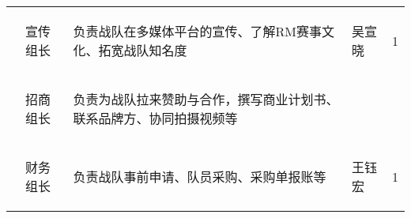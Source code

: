 \begin{longtable}{X | X | X | X | X}
    \cline{2-5}

        &
        \begin{center}
            宣传组长
        \end{center} &
        负责战队在多媒体平台的宣传、了解RM赛事文化、拓宽战队知名度 &
    \begin{center}
        吴宣晓
    \end{center}&
        \begin{center}
            1
        \end{center}\\

    \cline{2-5}

        &
        \begin{center}
            招商组长
        \end{center} &
        负责为战队拉来赞助与合作，撰写商业计划书、联系品牌方、协同拍摄视频等 &
        \begin{center}
            
        \end{center}&
        \begin{center}
            
        \end{center}\\

    \cline{2-5}

        &
        \begin{center}
            财务组长
        \end{center} &
        负责战队事前申请、队员采购、采购单报账等 &
        \begin{center}
            王钰宏
        \end{center} &
        \begin{center}
            1
        \end{center}\\

    \hline
    
\end{longtable}